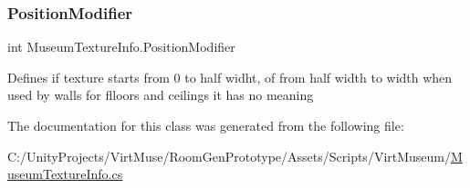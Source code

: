 \subsubsection{\texorpdfstring{Position\+Modifier}{PositionModifier}}
{\footnotesize\ttfamily int Museum\+Texture\+Info.\+Position\+Modifier}



Defines if texture starts from 0 to half widht, of from half width to width when used by walls for flloors and ceilings it has no meaning 



The documentation for this class was generated from the following file\+:\begin{DoxyCompactItemize}
\item 
C\+:/\+Unity\+Projects/\+Virt\+Muse/\+Room\+Gen\+Prototype/\+Assets/\+Scripts/\+Virt\+Museum/\mbox{\hyperlink{_museum_texture_info_8cs}{Museum\+Texture\+Info.\+cs}}\end{DoxyCompactItemize}

